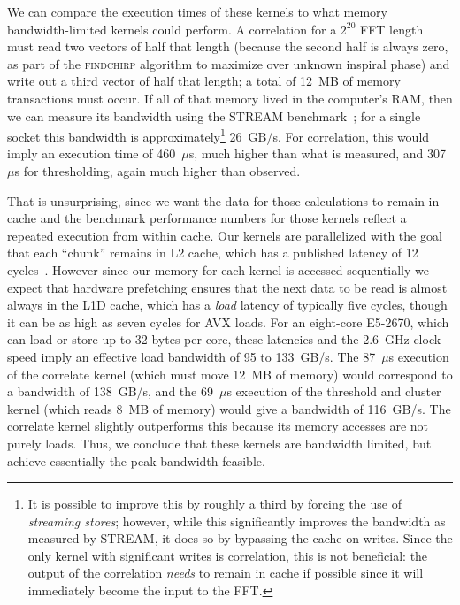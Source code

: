 We can compare the execution times of these kernels to what memory
bandwidth-limited kernels could perform.  A correlation for a $2^{20}$ FFT
length must read two vectors of half that length (because the second half is
always zero, as part of the \textsc{findchirp} algorithm to maximize over
unknown inspiral phase) and write out a third vector of half that length; a
total of 12~MB of memory transactions must occur. If all of that memory lived in
the computer's RAM, then we can measure its bandwidth using the STREAM
benchmark~\cite{McCalpin1995}; for a single socket this bandwidth is
approximately\footnote{It is possible to improve this by roughly a third
  by forcing the use of \emph{streaming stores}; however, while this
  significantly improves the bandwidth as measured by STREAM, it does so by
  bypassing the cache on writes.  Since the only kernel with significant writes
  is correlation, this is not beneficial: the output of the correlation
  \emph{needs} to remain in cache if possible since it will immediately become
  the input to the FFT.} 26~GB/s. For correlation, this would imply an execution
time of 460~$\mu$s, much higher than what is measured, and 307~$\mu$s for
thresholding, again much higher than observed.  

That is unsurprising, since we want the data for those calculations to remain in
cache and the benchmark performance numbers for those kernels reflect a repeated
execution from within cache.  Our kernels are parallelized with the goal that
each ``chunk'' remains in L2 cache, which has a published latency of 12
cycles~\cite{inteloptimize.2014.09}.  However since our memory for each kernel
is accessed sequentially we expect that hardware prefetching ensures that the
next data to be read is almost always in the L1D cache, which has a \emph{load}
latency of typically five cycles, though it can be as high as seven cycles for
AVX loads. For an eight-core E5-2670, which can load or store up to 32 bytes per
core, these latencies and the 2.6~GHz clock speed imply an effective load
bandwidth of 95 to 133~GB/s.  The 87~$\mu$s execution of the correlate kernel (which
must move 12~MB of memory) would correspond to a bandwidth of 138~GB/s, and the
69~$\mu$s execution of the threshold and cluster kernel (which reads 8~MB of
memory) would give a bandwidth of 116~GB/s. The correlate kernel slightly
outperforms this because its memory accesses are not purely loads. Thus, we
conclude that these kernels are bandwidth limited, but achieve essentially the
peak bandwidth feasible.

